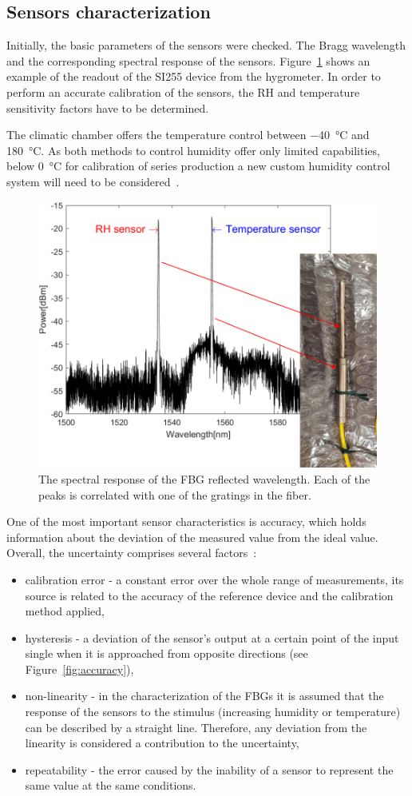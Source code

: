 \subsection{Sensors characterization}

Initially, the basic parameters of the sensors were checked. The Bragg wavelength and the corresponding spectral response of the sensors. 
Figure~\ref{fig_hygrometer1} shows an example of the readout of the SI255 device from the hygrometer. In order to perform an accurate calibration of the sensors, the \gls{RH} and temperature sensitivity factors have to be determined.

The climatic chamber offers the temperature control between \SI{-40}{\celsius} and \SI{180}{\celsius}. As both methods to control humidity offer only limited capabilities, below \SI{0}{\celsius} for calibration of series production a new custom humidity control system will need to be considered~\cite{Berruti, Veldscholte:2021wjt}.
\begin{figure}[!h]
\centering
\includegraphics[width=0.6\columnwidth]{Chapter5/images/hygr.png}
\caption{The spectral response of the FBG reflected wavelength. Each of the peaks is correlated with one of the gratings in the fiber.}
\label{fig_hygrometer1}
\end{figure}
\newpage
One of the most important sensor characteristics is accuracy, which holds information about the deviation of the measured value from the ideal value. Overall, the uncertainty comprises several factors~\cite{sensors_physics}:
\begin{itemize}
    \item calibration error - a constant error over the whole range of measurements, its source is related to the accuracy of the reference device and the calibration method applied,
    \item hysteresis - a deviation of the sensor's output at a certain point of the input single when it is approached from opposite directions (see Figure~\ref{fig:accuracy}), 
    \item non-linearity - in the characterization of the \glspl{FBG} it is assumed that the response of the sensors to the stimulus (increasing humidity or temperature) can be described by a straight line. Therefore, any deviation from the linearity is considered a contribution to the uncertainty,
    \item repeatability - the error caused by the inability of a sensor to represent the same value at the same conditions. 
\end{itemize}
